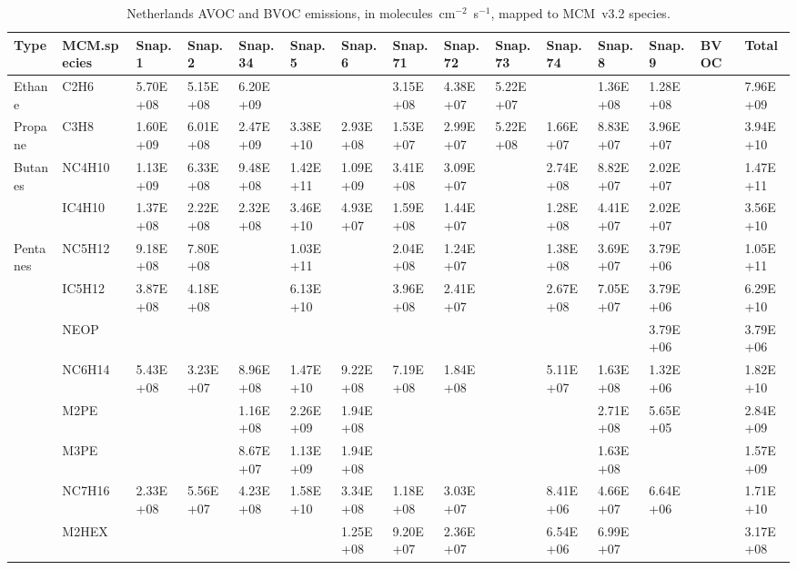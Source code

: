 \tiny
\begin{longtable}{lllllllllllllll}
	\caption{Netherlands AVOC and BVOC emissions, in molecules~cm$^{-2}$~s$^{-1}$, mapped to MCM~v3.2 species.}\\%
	\hline \hline
	\textbf{Type} & \textbf{MCM.species} & \textbf{Snap.1} & \textbf{Snap.2} & \textbf{Snap.34} & \textbf{Snap.5} & \textbf{Snap.6} & \textbf{Snap.71} & \textbf{Snap.72} & \textbf{Snap.73} & \textbf{Snap.74} & \textbf{Snap.8} & \textbf{Snap.9} & \textbf{BVOC} & \textbf{Total}\\
	\endhead
	\hline
	Ethane & C2H6 & 5.70E+08 & 5.15E+08 & 6.20E+09 &  &  & 3.15E+08 & 4.38E+07 & 5.22E+07 &  & 1.36E+08 & 1.28E+08 &  & 7.96E+09 \\
	\hline Propane & C3H8 & 1.60E+09 & 6.01E+08 & 2.47E+09 & 3.38E+10 & 2.93E+08 & 1.53E+07 & 2.99E+07 & 5.22E+08 & 1.66E+07 & 8.83E+07 & 3.96E+07 &  & 3.94E+10 \\ \hline
	\multirow{2}{*}{Butanes} & NC4H10 & 1.13E+09 & 6.33E+08 & 9.48E+08 & 1.42E+11 & 1.09E+09 & 3.41E+08 & 3.09E+07 &  & 2.74E+08 & 8.82E+07 & 2.02E+07 &  & 1.47E+11 \\
	 & IC4H10 & 1.37E+08 & 2.22E+08 & 2.32E+08 & 3.46E+10 & 4.93E+07 & 1.59E+08 & 1.44E+07 &  & 1.28E+08 & 4.41E+07 & 2.02E+07 &  & 3.56E+10 \\
	\hline \multirow{3}{*}{Pentanes} & NC5H12 & 9.18E+08 & 7.80E+08 &  & 1.03E+11 &  & 2.04E+08 & 1.24E+07 &  & 1.38E+08 & 3.69E+07 & 3.79E+06 &  & 1.05E+11 \\
	 & IC5H12 & 3.87E+08 & 4.18E+08 &  & 6.13E+10 &  & 3.96E+08 & 2.41E+07 &  & 2.67E+08 & 7.05E+07 & 3.79E+06 &  & 6.29E+10 \\
	 & NEOP &  &  &  &  &  &  &  &  &  &  & 3.79E+06 &  & 3.79E+06 \\
	\hline \parbox[t]{2mm}{} & NC6H14 & 5.43E+08 & 3.23E+07 & 8.96E+08 & 1.47E+10 & 9.22E+08 & 7.19E+08 & 1.84E+08 &  & 5.11E+07 & 1.63E+08 & 1.32E+06 &  & 1.82E+10 \\
	 & M2PE &  &  & 1.16E+08 & 2.26E+09 & 1.94E+08 &  &  &  &  & 2.71E+08 & 5.65E+05 &  & 2.84E+09 \\
	 & M3PE &  &  & 8.67E+07 & 1.13E+09 & 1.94E+08 &  &  &  &  & 1.63E+08 &  &  & 1.57E+09 \\
	 & NC7H16 & 2.33E+08 & 5.56E+07 & 4.23E+08 & 1.58E+10 & 3.34E+08 & 1.18E+08 & 3.03E+07 &  & 8.41E+06 & 4.66E+07 & 6.64E+06 &  & 1.71E+10 \\
	 & M2HEX &  &  &  &  & 1.25E+08 & 9.20E+07 & 2.36E+07 &  & 6.54E+06 & 6.99E+07 &  &  & 3.17E+08 \\

\end{longtable}
